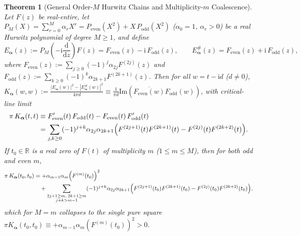 \documentclass[11pt,reqno]{amsart}
\newtheorem{theorem}{Theorem}[section]
\theoremstyle{definition}
\theoremstyle{remark}
\numberwithin{equation}{section}
\newcommand{\R}{\mathbb{R}}
\newcommand{\dd}{\mathrm{d}}
\newcommand{\ii}{\mathrm{i}}
\newcommand{\Ima}{\mathrm{Im}}
\begin{document}
\begin{theorem}[General Order-$M$ Hurwitz Chains and Multiplicity-$m$ Coalescence]\label{thm:hurwitz_chain}
Let $F(z)$ be real-entire, let $P_M(X) = \sum_{r=0}^M \alpha_r X^r = P_{\mathrm{even}}(X^2) + X\,P_{\mathrm{odd}}(X^2)$ ($\alpha_0 = 1$, $\alpha_r > 0$) be a real Hurwitz polynomial of degree $M \ge 1$, and define
\begin{equation}\label{eq:E_alpha_M_def}
E_{\boldsymbol{\alpha}}(z) := P_M\left(-\ii\frac{\dd}{\dd z}\right)F(z) = F_{\mathrm{even}}(z) - \ii\,F_{\mathrm{odd}}(z), \qquad E_{\boldsymbol{\alpha}}^\#(z) = F_{\mathrm{even}}(z) + \ii\,F_{\mathrm{odd}}(z),
\end{equation}
where $F_{\mathrm{even}}(z) := \sum_{j \ge 0} (-1)^j \alpha_{2j}F^{(2j)}(z)$ and $F_{\mathrm{odd}}(z) := \sum_{k \ge 0} (-1)^k \alpha_{2k+1}F^{(2k+1)}(z)$. Then for all $w = t - \ii d$ ($d \neq 0$), $K_{\boldsymbol{\alpha}}(w, w) := \frac{|E_{\boldsymbol{\alpha}}(w)|^2 - |E_{\boldsymbol{\alpha}}^\#(w)|^2}{4\pi d} \equiv \frac{1}{\pi d}\Ima(\overline{F_{\mathrm{even}}(w)}F_{\mathrm{odd}}(w))$, with critical-line limit
\begin{equation}\label{eq:bezout_wronskian_d0}
\begin{aligned}
\pi\,K_{\boldsymbol{\alpha}}(t,t) &\equiv F_{\mathrm{even}}'(t)\,F_{\mathrm{odd}}(t) - F_{\mathrm{even}}(t)\,F_{\mathrm{odd}}'(t) \\
&= \sum_{j,k \ge 0} (-1)^{j+k}\alpha_{2j}\alpha_{2k+1}\Bigl(F^{(2j+1)}(t)F^{(2k+1)}(t) - F^{(2j)}(t)F^{(2k+2)}(t)\Bigr).
\end{aligned}
\end{equation}
If $t_0 \in \R$ is a real zero of $F(t)$ of multiplicity $m$ ($1 \le m \le M$), then for both odd and even $m$,
\begin{equation}\label{eq:universal_hurwitz_coalescence}
\begin{aligned}
\pi\,K_{\boldsymbol{\alpha}}(t_0, t_0) &= +\alpha_{m-1}\alpha_m\Bigl(F^{(m)}(t_0)\Bigr)^2 \\
&\quad + \sum_{\substack{2j+1 \ge m,\; 2k+1 \ge m \\ j+k > m-1}} (-1)^{j+k}\alpha_{2j}\alpha_{2k+1}\Bigl(F^{(2j+1)}(t_0)F^{(2k+1)}(t_0) - F^{(2j)}(t_0)F^{(2k+2)}(t_0)\Bigr),
\end{aligned}
\end{equation}
which for $M = m$ collapses to the single pure square $\pi K_{\boldsymbol{\alpha}}(t_0, t_0) \equiv +\alpha_{m-1}\alpha_m(F^{(m)}(t_0))^2 > 0$.
\end{theorem}
\end{document}
